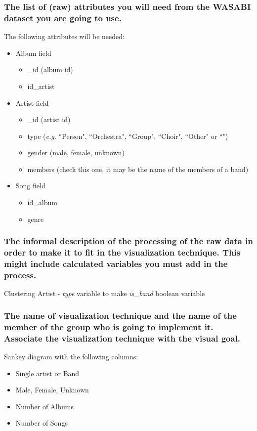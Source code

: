\documentclass{article}
\begin{document}
\subsubsection*{The list of (raw) attributes you will need from the WASABI dataset you are going to use.}
The following attributes will be needed:
\begin{itemize}
    \item Album field
          \begin{itemize}
              \item \_id (album id)
              \item id\_artist
          \end{itemize}
    \item Artist field
          \begin{itemize}
              \item \_id (artist id)
              \item type (\textit{e.g.} ``Person", ``Orchestra", ``Group", ``Choir", ``Other" or ``")
              \item gender (male, female, unknown)
              \item members (check this one, it may be the name of the members of a band)
          \end{itemize}
    \item Song field
          \begin{itemize}
              \item id\_album
              \item genre
          \end{itemize}
\end{itemize}
\subsubsection*{The informal description of the processing of the raw data in order to make it to fit in the visualization technique. This might include calculated variables you must add in the process.}
Clustering Artist - \textit{type} variable to make \textit{is\_band} boolean variable


\subsubsection*{The name of visualization technique and the name of the member of the group who is going to implement it. Associate the visualization technique with the visual goal.}
Sankey diagram with the following columns:
\begin{itemize}
    \item Single artist or Band
    \item Male, Female, Unknown
    \item Number of Albums
    \item Number of Songs
\end{itemize}
\end{document}
